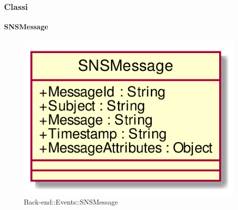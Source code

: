 \subsubsection{Classi}
\hypertarget{SNSMessage_label}{\paragraph{SNSMessage}}
\begin{figure}[h]
	\centering
	\includegraphics[width=\textwidth,height=\textheight,keepaspectratio]{images/ClassSNSMessage.png}
	\caption{Back-end::Events::SNSMessage}
\end{figure}
